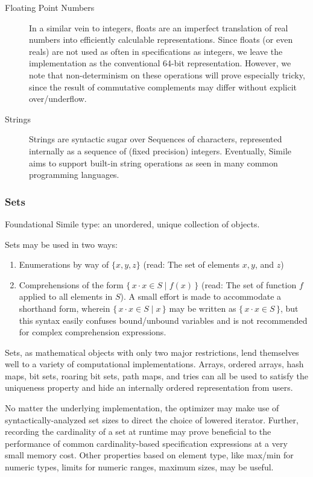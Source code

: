 \documentclass{article}
\newcommand{\bSet}[3]{%
  \{\, #1 \cdot #2 \mid #3 \, \}%
}
\newcommand{\bSetT}[2]{%
  \{\, #1 \cdot #2 \,\}%
}
\begin{document}
\begin{description}
    \item[Floating Point Numbers] In a similar vein to integers, floats are an imperfect translation of real numbers into efficiently calculable representations. Since floats (or even reals) are not used as often in specifications as integers, we leave the implementation as the conventional 64-bit representation. However, we note that non-determinism on these operations will prove especially tricky, since the result of commutative complements may differ without explicit over/underflow.
    \item[Strings] Strings are syntactic sugar over Sequences of characters, represented internally as a sequence of (fixed precision) integers. Eventually, Simile aims to support built-in string operations as seen in many common programming languages.
\end{description}

\subsubsection{Sets}
Foundational Simile type: an unordered, unique collection of objects.

Sets may be used in two ways:
\begin{enumerate}
    \item Enumerations by way of $\{x,y,z\}$ (read: The set of elements $x,y$, and $z$)
    \item Comprehensions of the form $\bSet{x}{x \in S}{f(x)}$ (read: The set of function $f$ applied to all elements in $S$). A small effort is made to accommodate a shorthand form, wherein $\bSet{x}{x \in S}{x}$ may be written as $\bSetT{x}{x \in S}$, but this syntax easily confuses bound/unbound variables and is not recommended for complex comprehension expressions.
\end{enumerate}

Sets, as mathematical objects with only two major restrictions, lend themselves well to a variety of computational implementations. Arrays, ordered arrays, hash maps, bit sets, roaring bit sets, path maps, and tries can all be used to satisfy the uniqueness property and hide an internally ordered representation from users.


No matter the underlying implementation, the optimizer may make use of syntactically-analyzed set sizes to direct the choice of lowered iterator. Further, recording the cardinality of a set at runtime may prove beneficial to the performance of common cardinality-based specification expressions at a very small memory cost. Other properties based on element type, like max/min for numeric types, limits for numeric ranges, maximum sizes, may be useful.
\end{document}
